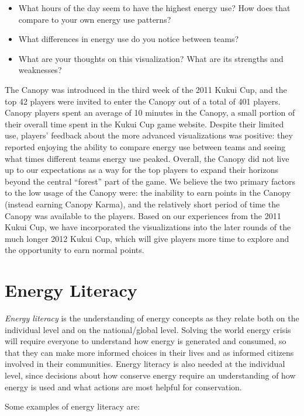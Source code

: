 \documentclass{sigchi}
\begin{document}
\begin{itemize}
	\item What hours of the day seem to have the highest energy use? How does that compare to your own energy use patterns?
	\item What differences in energy use do you notice between teams?
	\item What are your thoughts on this visualization? What are its strengths and weaknesses?
\end{itemize}

The Canopy was introduced in the third week of the 2011 Kukui Cup, and the top 42 players were invited to enter the Canopy out of a total of 401 players. Canopy players spent an average of 10 minutes in the Canopy, a small portion of their overall time spent in the Kukui Cup game website. Despite their limited use, players' feedback about the more advanced visualizations was positive: they reported enjoying the ability to compare energy use between teams and seeing what times different teams energy use peaked. Overall, the Canopy did not live up to our expectations as a way for the top players to expand their horizons beyond the central ``forest'' part of the game. We believe the two primary factors to the low usage of the Canopy were: the inability to earn points in the Canopy (instead earning Canopy Karma), and the relatively short period of time the Canopy was available to the players. Based on our experiences from the 2011 Kukui Cup, we have incorporated the visualizations into the later rounds of the much longer 2012 Kukui Cup, which will give players more time to explore and the opportunity to earn normal points.


\section{Energy Literacy}
\label{sec:energy-literacy}

\emph{Energy literacy} is the understanding of energy concepts as they relate both on the individual level and on the national/global level. Solving the world energy crisis will require everyone to understand how energy is generated and consumed, so that they can make more informed choices in their lives and as informed citizens involved in their communities. Energy literacy is also needed at the individual level, since decisions about how conserve energy require an understanding of how energy is used and what actions are most helpful for conservation.

Some examples of energy literacy are:
\end{document}
